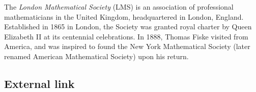 \documentclass[12pt]{article}
\begin{document}
The {\em London Mathematical Society} (LMS) is an association of professional mathematicians in the United Kingdom, headquartered in London, England. Established in 1865 in London, the Society was granted royal charter by Queen Elizabeth II at its centennial celebrations. In 1888, Thomas Fiske visited from America, and was inspired to found the New York Mathematical Society (later renamed American Mathematical Society) upon his return.

\subsection{External link}
\end{document}
